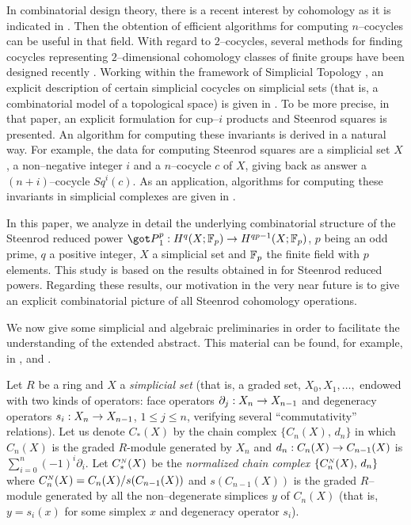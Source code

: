In combinatorial design theory, there is a recent interest
by cohomology as it is indicated in
\cite{HL93}. Then the obtention of efficient algorithms for
computing $n$--cocycles can be useful in that field. With
regard to $2$--cocycles, several methods for
       finding cocycles re\-pre\-senting $2$--dimensional
       cohomology classes of finite groups have been designed
       recently \cite{EGL97, HL93, Lam97}. Working within the framework of
    Simplicial Topology \cite{May67}, an explicit description of
    certain simplicial cocycles on simplicial sets (that is, a
    combinatorial model of a topological space) is given in
    \cite{jpaa}. To be more precise, in that paper,
    an explicit
       formulation for cup--$i$ products and Steenrod squares
       is
       presented. An
        algorithm     for computing these
       invariants is derived in a
       natural way. For example,
     the  data for computing Steenrod squares are
    a simplicial set $X$,
a non--negative integer $i$ and a
$n$--cocycle $c$ of $X$, giving back as
answer a $(n+i)$--cocycle $Sq^{i}(c)$.
As an application, algorithms
       for computing these
       invariants in simplicial complexes are given in \cite{casc99}.


        In this
       paper, we analyze in detail the underlying combinatorial structure
       of the
       Steenrod reduced power ${\got P}_1^{p}: H^q (X; \Fp) \rightarrow
       H^{qp-1} (X; \Fp)$,  $p$ being an odd prime, $q$ a positive
       integer, $X$ a simplicial set and ${\Bbb F}_p$ the finite field
       with $p$ elements. This study is based on the  results obtained in
        \cite{jpaa} for Steenrod reduced powers. Regarding these
        results, our motivation in the very near future
        is to give an explicit combinatorial
         picture of all Steenrod cohomology operations.


   We now give some simplicial and algebraic preliminaries
in order to
  facilitate the understanding of the extended abstract. This
  material
 can be found, for example, in
  \cite{May67}, \cite{MacL75} and \cite{Wei94}.


 Let $R$ be a ring and $X$ a {\em simplicial set} (that is, a
graded set, $X_0,X_1, \ldots,$ endowed with two kinds of operators:
face operators $\partial_j:X_n\rightarrow X_{n-1}$ and degeneracy operators
$s_i:X_n\rightarrow X_{n-1}$, $1\leq j\leq n$, verifying several
``commutativity'' relations). Let us denote $C_*(X)$ by the chain
complex $\{C_n(X),\, d_n\}$ in which $C_n(X)$ is the graded
$R$-module generated by $X_n$ and $d_n: C_n(X)\rightarrow C_{n-1}(X)$ is
$\sum_{i=0}^n(-1)^i\partial_i$.
Let $C_*^{\scriptscriptstyle N}(X)$ be the {\em normalized
chain complex} $\{C^{\scriptscriptstyle N}_n(X),\, d_n\}$ where
$C_n^{\scriptscriptstyle N}(X)=C_n(X)/s(C_{n-1}(X))$ and $s(C_{n-1}(X))$
is the graded $R$--module generated by all the non--degenerate simplices
$y$ of $C_n(X)$ (that is,   $y=s_i(x)$
for some simplex $x$ and degeneracy operator
$s_i$).

